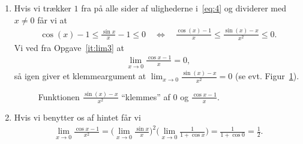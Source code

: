 \begin{enumerate}
	\item Hvis vi trækker $1$ fra på alle sider af ulighederne i~\eqref{eq:4} og dividerer med $x\neq 0$ får vi at 
	\begin{align*}
	\cos(x)-1\leq \frac{\sin x}{x}-1\leq 0\quad\Leftrightarrow \quad \frac{\cos(x)-1}{x}\leq \frac{\sin(x)-x}{x^2}\leq 0.
	\end{align*}
	 Vi ved fra Opgave~\ref{it:lim3} at 
	 \begin{align*}
	\lim_{x\to 0}\frac{\cos x-1}{x}=0,
 	\end{align*}
	så igen giver et klemmeargument at $\lim_{x\to 0}\frac{\sin(x)-x}{x^2}=0$ (se evt. Figur~\ref{fig:trig6}).
	\begin{figure}
	\centering
	\caption{Funktionen $ \frac{\sin(x)-x}{x^2} $ ``klemmes'' af $0$ og $\frac{\cos x-1}{x}$.}
	\label{fig:trig6}
	\end{figure}

	
	
	\item\label{it:lim5ans} Hvis vi benytter os af hintet får vi	
	\begin{align*}
	\lim_{x\to 0}\frac{\cos x-1}{x^2}=\Big(\lim_{x\to 0}\frac{\sin x}{x}\Big)^2\Big(\lim_{x\to 0}\frac{1}{1+\cos x}\Big)=\frac{1}{1+\cos 0}=\frac{1}{2}.
	\end{align*}
\end{enumerate}